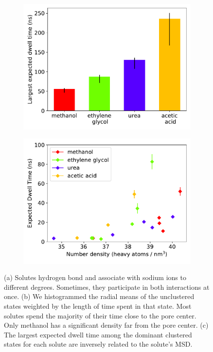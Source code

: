 \documentclass[journal=jpcbfk,manuscript=article]{achemso}
\begin{document}
\begin{figure}
\begin{subfigure}{0.49\textwidth}
  \includegraphics[width=\textwidth]{dwell_time_summary.pdf}
  \caption{}\label{fig:dwell_time_summary}
  \end{subfigure}
  \begin{subfigure}{0.49\textwidth}
  \includegraphics[width=\textwidth]{density_comparison.pdf}
  \caption{}\label{fig:density_comparison}
  \end{subfigure}
  \caption{(a) Solutes hydrogen bond and associate with sodium ions
  to different degrees. Sometimes, they participate in both interactions at
  once. (b) We histogrammed the radial means of the unclustered states weighted
  by the length of time spent in that state. Most solutes spend the majority of
  their time close to the pore center. Only methanol has a significant density
  far from the pore center. (c) The largest expected dwell time among the dominant 
  clustered states for each solute are inversely related to the solute's MSD. 
 }\label{fig:summaries}
  \end{figure}
  
\end{document}
